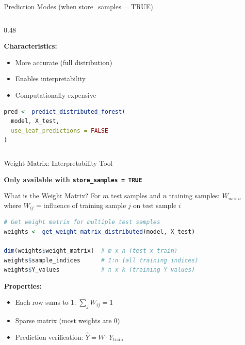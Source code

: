 \documentclass[aspectratio=169]{beamer}
\begin{document}
\begin{frame}[fragile]{Prediction Modes (when store\_samples = TRUE)}
\begin{columns}[T]
\begin{column}{0.48\textwidth}
\vspace{0.2cm}

\textbf{Characteristics:}
\begin{itemize}
\item More accurate (full distribution)
\item Enables interpretability
\item Computationally expensive
\end{itemize}

\vspace{0.2cm}

\begin{lstlisting}[language=R, basicstyle=\tiny\ttfamily]
pred <- predict_distributed_forest(
  model, X_test,
  use_leaf_predictions = FALSE
)
\end{lstlisting}

\end{column}

\end{columns}

\end{frame}

\begin{frame}[fragile]{Weight Matrix: Interpretability Tool}

\textbf{Only available with \texttt{store\_samples = TRUE}}

\vspace{0.3cm}

\begin{block}{What is the Weight Matrix?}
For $m$ test samples and $n$ training samples: $W_{m \times n}$ where $W_{ij}$ = influence of training sample $j$ on test sample $i$
\end{block}

\vspace{0.3cm}

\begin{lstlisting}[language=R, basicstyle=\tiny\ttfamily]
# Get weight matrix for multiple test samples
weights <- get_weight_matrix_distributed(model, X_test)

dim(weights$weight_matrix)  # m x n (test x train)
weights$sample_indices      # 1:n (all training indices)
weights$Y_values            # n x k (training Y values)
\end{lstlisting}

\vspace{0.3cm}

\textbf{Properties:}
\begin{itemize}
\item Each row sums to 1: $\sum_j W_{ij} = 1$
\item Sparse matrix (most weights are 0)
\item Prediction verification: $\hat{Y} = W \cdot Y_{\text{train}}$
\end{itemize}

\end{frame}
\end{document}
